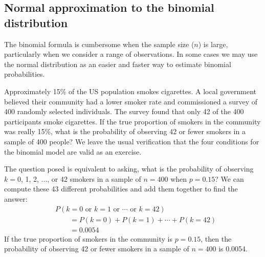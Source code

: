 \newpage


\subsection{Normal approximation to the binomial distribution}
\label{normalApproxBinomialDistSubsection}


The binomial formula is cumbersome when the sample size ($n$) is large, particularly when we consider a range of observations. In some cases we may use the normal distribution as an easier and faster way to estimate binomial probabilities.

\newcommand{\smokeprop}{0.15}
\newcommand{\smokeperc}{15\%}
\newcommand{\smokepropcomp}{0.85}
\newcommand{\smokeperccomp}{85\%}
\newcommand{\smokex}{42}
\newcommand{\smokexplusone}{43}
\newcommand{\smoken}{400}
\newcommand{\smokelowertailbinom}{0.0054}
\newcommand{\smokemean}{60}
\newcommand{\smokemeancomp}{340}
\newcommand{\smokesd}{7.14}
\newcommand{\smokez}{-2.52}
\newcommand{\smokelowertailnormal}{0.0059}

\begin{examplewrap}
\begin{nexample}{Approximately \smokeperc{} of the
    US population smokes cigarettes.
    A local government believed their community had
    a lower smoker rate and commissioned a survey of
    400 randomly selected individuals.
    The survey found that only \smokex{} of the
    \smoken{} participants smoke cigarettes.
    If the true proportion of smokers in the community
    was really \smokeperc{}, what is the probability
    of observing \smokex{} or fewer smokers in a sample
    of \smoken{} people?}
  \label{exactBinomSmokerExSetup}%
  We leave the usual verification that the four conditions
  for the binomial model are valid as an exercise.

  The question posed is equivalent to asking,
  what is the probability of observing
  $k=0$, 1, 2, ..., or \smokex{} smokers in a sample of
  $n = \smoken{}$ when $p=\smokeprop{}$?
  We can compute these \smokexplusone{} different
  probabilities and add them together to find the answer:
  \begin{align*}
  &P(k=0\text{ or }k=1\text{ or }\cdots\text{ or } k=\smokex{}) \\
	&\qquad = P(k=0) + P(k=1) + \cdots + P(k=\smokex{}) \\
	&\qquad = \smokelowertailbinom{}
  \end{align*}
  If the true proportion of smokers in the community
  is $p=\smokeprop{}$, then the probability of observing
  \smokex{} or fewer smokers in a sample of $n=\smoken{}$
  is \smokelowertailbinom{}.
\end{nexample}
\end{examplewrap}

